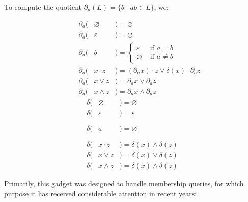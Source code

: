 \documentclass[sigplan,review,acmsmall,nonacm,screen,anonymous]{acmart}\settopmatter{printfolios=false,printccs=false,printacmref=false}
\begin{document}
  \begin{definition}[Brzozowski, 1964]
    To compute the quotient \(\partial_a(L) = \{b \mid ab \in L\}\), we:

    \vspace{-0.8cm}
    \begin{multicols}{2}
      \begin{eqnarray*}
        \phantom{--}\partial_a(& \varnothing &) = \varnothing                                           \\
        \phantom{--}\partial_a(& \varepsilon &) = \varnothing                                           \\
        \phantom{--}\partial_a(& b           &) = \begin{cases}\varepsilon &\text{ if } a = b\\ \varnothing &\text{ if } a \neq b \end{cases}\\
        \phantom{--}\partial_a(& x\cdot z    &) = (\partial_a x)\cdot z \vee \delta(x)\cdot\partial_a z \\
        \phantom{--}\partial_a(& x\vee  z    &) =  \partial_a x \vee  \partial_a z                       \\
        \phantom{--}\partial_a(& x\land z    &) =  \partial_a x \land \partial_a z
      \end{eqnarray*} \break\vspace{-0.45cm}
      \begin{eqnarray*}
        \delta(& \varnothing &) = \varnothing                                      \\
        \delta(& \varepsilon &) = \varepsilon                                      \\
        \delta(& a           &) = \varnothing\phantom{\begin{cases}\varepsilon\\\varnothing\end{cases}}\\
        \delta(& x\cdot z    &) = \delta(x) \land \delta(z)                        \\
        \delta(& x\vee  z    &) = \delta(x) \vee  \delta(z)                        \\
        \delta(& x\land z    &) = \delta(x) \land \delta(z)
      \end{eqnarray*}
    \end{multicols}
  \end{definition}

  Primarily, this gadget was designed to handle membership queries, for which purpose it has received considerable attention in recent years:
\end{document}
